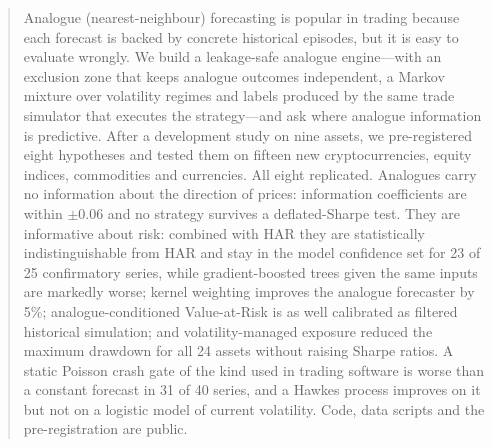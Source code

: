\begin{abstract}
Analogue (nearest-neighbour) forecasting is popular in trading because each forecast is backed by
concrete historical episodes, but it is easy to evaluate wrongly. We build a leakage-safe analogue
engine---with an exclusion zone that keeps analogue outcomes independent, a Markov mixture over
volatility regimes and labels produced by the same trade simulator that executes the
strategy---and ask where analogue information is predictive. After a development study on nine
assets, we pre-registered eight hypotheses and tested them on fifteen new cryptocurrencies, equity
indices, commodities and currencies. All eight replicated. Analogues carry no information about the
direction of prices: information coefficients are within $\pm0.06$ and no strategy survives a
deflated-Sharpe test. They are informative about risk: combined with HAR they are statistically
indistinguishable from HAR and stay in the model confidence set for 23 of 25 confirmatory series,
while gradient-boosted trees given the same inputs are markedly worse; kernel weighting improves the analogue
forecaster by 5\%; analogue-conditioned Value-at-Risk is as well calibrated as filtered historical
simulation; and volatility-managed exposure reduced the maximum drawdown for all 24 assets without
raising Sharpe ratios. A static Poisson crash gate of the kind used in trading software is worse
than a constant forecast in 31 of 40 series, and a Hawkes process improves on it but not on a logistic model of
current volatility. Code, data scripts and the pre-registration are public.
\end{abstract}
